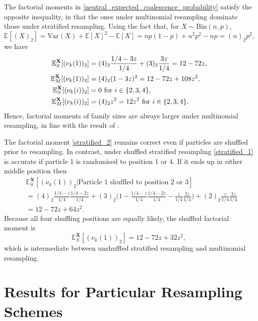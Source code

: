 \documentclass[a4paper,11pt]{article}
\theoremstyle{definition}
\newcommand{\bbE}{\mathbb{E}}
\newcommand{\bfX}{\mathbf{X}}
\begin{document}
The factorial moments in \eqref{neutral_expected_coalescence_probability} satisfy the opposite inequality, in that the ones under multinomial resampling dominate those under stratified resampling.
Using the fact that, for $X \sim \text{Bin}(n, p)$,
\begin{equation*}
\bbE[ ( X )_2 ] = \text{Var}( X ) + \bbE[ X ]^2 - \bbE[ X ] = n p ( 1 - p ) + n^2 p^2 - n p = ( n )_2 p^2,
\end{equation*}
we have
\begin{align}
\bbE_S^{ \bfX }[ ( \nu_k( 1 ) )_2 ] &= ( 4 )_2 \frac{ 1 / 4 - 3 z }{ 1 / 4 } + ( 3 )_2 \frac{ 3 z }{ 1 / 4 } = 12 - 72 z, \label{stratified_1}\\
\bbE_M^{ \bfX }[ ( \nu_k( 1 ) )_2 ] &= ( 4 )_2 ( 1 - 3z )^2 = 12 - 72z + 108z^2, \notag \\
\bbE_S^{ \bfX }[ ( \nu_k( i ) )_2 ] &= 0 \text{ for }  i \in \{ 2, 3, 4 \}, \label{stratified_2}\\
\bbE_M^{ \bfX }[ ( \nu_k( i ) )_2 ] &= (4)_2 z^2 = 12 z^2 \text{ for }  i \in \{ 2, 3, 4 \}. \notag
\end{align}
Hence, factorial moments of family sizes are always larger under multinomial resampling, in line with the result of \cite{brownetal:2021}.

The factorial moment \eqref{stratified_2} remains correct even if particles are shuffled prior to resampling.
In contrast, under shuffled stratified resampling \eqref{stratified_1} is accurate if particle 1 is randomised to position 1 or 4.
If it ends up in either middle position then
\begin{align*}
&\bbE_S^{ \bfX }[ ( \nu_k( 1 ) )_2 | \text{Particle } 1 \text{ shuffled to position } 2 \text{ or } 3 ] \\
&= ( 4 )_2 \frac{ 1 / 4 - z }{ 1 / 4 } \frac{ 1 / 4 - 2 z }{ 1 / 4 } + ( 3 )_2 \Big(1 - \frac{ 1 / 4 - z }{ 1 / 4 } \frac{ 1 / 4 - 2 z }{ 1 / 4 }  - \frac{z}{1/4} \frac{2z}{1/4} \Big)+ ( 2 )_2 \frac{z}{1/4} \frac{2z}{1/4} \\
&= 12 - 72 z + 64 z^2.
\end{align*}
Because all four shuffling positions are equally likely, the shuffled factorial moment is
\begin{equation*}
\bbE_S^{\bfX}[( \nu_k( 1 ) )_2] = 12 - 72 z + 32 z^2,
\end{equation*}
which is intermediate between unshuffled stratified resampling and multinomial resampling.

\appendix
\section{Results for Particular Resampling Schemes} \label{app:particular}
\end{document}
